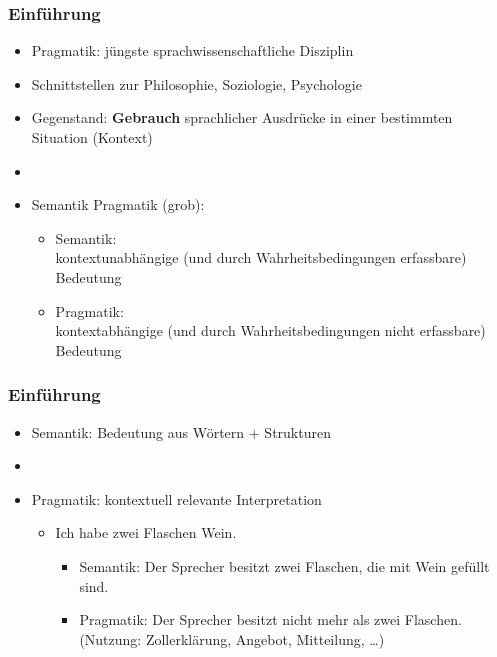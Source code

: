 \begin{frame}
\frametitle{Einführung}

\begin{itemize}
	\item Pragmatik: jüngste sprachwissenschaftliche Disziplin
	\item Schnittstellen zur Philosophie, Soziologie, Psychologie
	\item Gegenstand: \textbf{Gebrauch} sprachlicher Ausdrücke in einer bestimmten Situation (Kontext)
	\item[]
	\item Semantik \vs Pragmatik (grob):
	
	\begin{itemize}
		\item Semantik:\\
kontextunabhängige (und durch Wahrheitsbedingungen erfassbare) Bedeutung
		\item Pragmatik: \\
kontextabhängige  (und durch Wahrheitsbedingungen nicht erfassbare) Bedeutung
	\end{itemize}
	
\end{itemize}

\end{frame}



\begin{frame}
\frametitle{Einführung}

\begin{itemize}
	\item Semantik: Bedeutung aus Wörtern $+$ Strukturen
	\item[]
	\item Pragmatik: kontextuell relevante Interpretation
	
	\begin{itemize}
		\item Ich habe zwei Flaschen Wein.
		
		\begin{itemize}
			\item Semantik: Der Sprecher besitzt zwei Flaschen, die mit Wein gefüllt sind.
			\item Pragmatik: Der Sprecher besitzt nicht mehr als zwei Flaschen. (Nutzung: Zollerklärung, Angebot, Mitteilung, \dots)
		\end{itemize}
	\end{itemize}
\end{itemize}

\end{frame}


